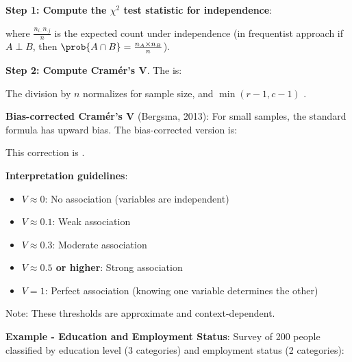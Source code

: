 \textbf{Step 1: Compute the $\chi^2$ test statistic for independence}:
\begin{center}
\end{center}
where $\frac{n_{i\cdot} n_{\cdot j}}{n}$ is the expected count under independence (in frequentist 
approach if $A\perp B$, then $\prob{A\cap B} = \frac{n_{A}\times n_{B}}{n}$).

\textbf{Step 2: Compute Cramér's V}. The  is:
\begin{center}
\end{center}

The division by $n$ normalizes for sample size, and $\min(r-1, c-1)$ .

\textbf{Bias-corrected Cramér's V} (Bergsma, 2013): For small samples, the standard formula
has upward bias. The bias-corrected version is:
\begin{center}
\end{center}

This correction is .

\textbf{Interpretation guidelines}:
\begin{itemize}
    \item \textbf{$V \approx 0$}: No association (variables are independent)
    \item \textbf{$V \approx 0.1$}: Weak association
    \item \textbf{$V \approx 0.3$}: Moderate association
    \item \textbf{$V \approx 0.5$ or higher}: Strong association
    \item \textbf{$V = 1$}: Perfect association (knowing one variable determines the other)
\end{itemize}

Note: These thresholds are approximate and context-dependent.

\textbf{Example - Education and Employment Status}: Survey of 200 people classified by education
level (3 categories) and employment status (2 categories):

